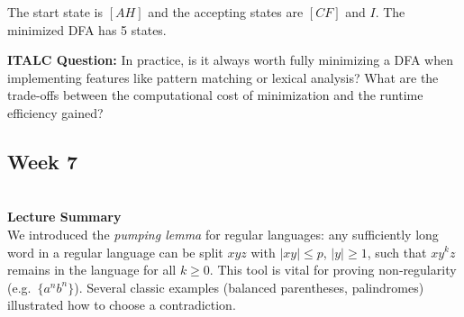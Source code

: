 \documentclass{article}
\theoremstyle{theorem}
\theoremstyle{definition}
\theoremstyle{remark}
\begin{document}
The start state is $[AH]$ and the accepting states are $[CF]$ and $I$. The minimized DFA has 5 states.

\textbf{ITALC Question:}
In practice, is it always worth fully minimizing a DFA when implementing features like pattern matching or lexical analysis? What are the trade-offs between the computational cost of minimization and the runtime efficiency gained?



\subsection{Week 7}\\
\textbf{Lecture Summary}\\
We introduced the \emph{pumping lemma} for regular languages: any sufficiently long word in a regular language can be split $xyz$ with $|xy|\le p$, $|y|\ge1$, such that $xy^kz$ remains in the language for all $k\ge0$.  This tool is vital for proving non‐regularity (e.g.\ $\{a^n b^n\}$).  Several classic examples (balanced parentheses, palindromes) illustrated how to choose a contradiction.
\end{document}
